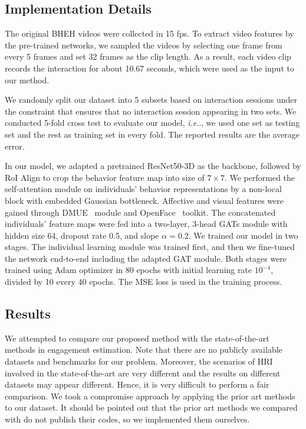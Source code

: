 \documentclass[VANCOUVER,STIX1COL]{WileyNJD-v2}
\makeatletter
\DeclareRobustCommand\onedot{\futurelet\@let@token\@onedot}
\def\@onedot{\ifx\@let@token.\else.\null\fi\xspace}
\def\ie{\emph{i.e}\onedot}
\makeatother
\begin{document}
\subsection{Implementation Details}
\label{subs:Implementation_Details}

The original BHEH videos were collected in 15 fps. To extract video features by the pre-trained networks, we sampled the videos by selecting one frame from every 5 frames and set 32 frames as the clip length. As a result, each video clip records the interaction for about 10.67 seconds, which were used as the input to our method.

We randomly split our dataset into 5 subsets based on interaction sessions under the constraint that ensures that no interaction session appearing in two sets. We conducted 5-fold cross test to evaluate our model, \ie, we used one set as testing set and the rest as training set in every fold. The reported results are the average error.

In our model, we adapted a pretrained ResNet50-3D as the backbone, followed by RoI Align to crop the behavior feature map into size of $7\times7$. We performed the self-attention module on individuals' behavior representations by a non-local block with embedded Gaussian bottleneck. Affective and visual features were gained through DMUE~\cite{She2021Dive} module and OpenFace~\cite{Baltrusaitis2018OpenFace} toolkit. The concatenated individuals' feature maps were fed into a two-layer, 3-head GATs module with hidden size 64, dropout rate 0.5, and slope $\alpha = 0.2$. We trained our model in two stages. The individual learning module was trained first, and then we fine-tuned the network end-to-end including the adapted GAT module. Both stages were trained using Adam optimizer in 80 epochs with initial learning rate $10^{-4}$, divided by 10 every 40 epochs. The MSE loss is used in the training process.

\subsection{Results}
\label{subs:Main_Results}

We attempted to compare our proposed method with the state-of-the-art methods in engagement estimation. Note that there are no publicly available datasets and benchmarks for our problem. Moreover, the scenarios of HRI involved in the state-of-the-art are very different and the results on different datasets may appear different. Hence, it is very difficult to perform a fair comparison. We took a compromise approach by applying the prior art methods to our dataset. It should be pointed out that the prior art methods we compared with do not publish their codes, so we implemented them ourselves.
\end{document}
